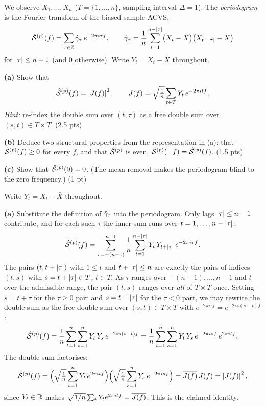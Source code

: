 \documentclass[11pt]{article}
\begin{document}

\statementstart
We observe $X_1,\dots,X_n$ ($T=\{1,\dots,n\}$, sampling interval $\Delta=1$). The \emph{periodogram} is the Fourier transform of the biased sample ACVS,
\[
\hat{\mathcal{S}}^{(p)}(f)=\sum_{\tau\in\mathbb{Z}}\hat{\gamma}_\tau\,e^{-2\pi i\tau f},
\qquad
\hat{\gamma}_\tau=\frac1n\sum_{t=1}^{n-\left\lvert \tau \right\rvert}\bigl(X_t-\bar X\bigr)\bigl(X_{t+\left\lvert \tau \right\rvert}-\bar X\bigr)
\]
for $\left\lvert \tau \right\rvert\le n-1$ (and $0$ otherwise). Write $Y_t=X_t-\bar X$ throughout.

\textbf{(a)} Show that
\[
\hat{\mathcal{S}}^{(p)}(f)=\left\lvert J(f) \right\rvert^2,\qquad J(f)=\sqrt{\tfrac1n}\sum_{t\in T} Y_t\,e^{-2\pi i t f}.
\]
\emph{Hint:} re-index the double sum over $(t,\tau)$ as a free double sum over $(s,t)\in T\times T$. \hfill(2.5 pts)

\textbf{(b)} Deduce two structural properties from the representation in (a): that $\hat{\mathcal{S}}^{(p)}(f)\ge0$ for every $f$, and that $\hat{\mathcal{S}}^{(p)}$ is even, $\hat{\mathcal{S}}^{(p)}(-f)=\hat{\mathcal{S}}^{(p)}(f)$. \hfill(1.5 pts)

\textbf{(c)} Show that $\hat{\mathcal{S}}^{(p)}(0)=0$. (The mean removal makes the periodogram blind to the zero frequency.) \hfill(1 pt)
\statementend

Write $Y_t=X_t-\bar X$ throughout.

\textbf{(a)} Substitute the definition of $\hat{\gamma}_\tau$ into the periodogram. Only lags $\left\lvert \tau \right\rvert\le n-1$ contribute, and for each such $\tau$ the inner sum runs over $t=1,\dots,n-\left\lvert \tau \right\rvert$:
\[
\hat{\mathcal{S}}^{(p)}(f)=\sum_{\tau=-(n-1)}^{n-1}\frac1n\sum_{t=1}^{n-\left\lvert \tau \right\rvert} Y_t\,Y_{t+\left\lvert \tau \right\rvert}\,e^{-2\pi i\tau f}.
\]
The pairs $(t,t+\left\lvert \tau \right\rvert)$ with $1\le t$ and $t+\left\lvert \tau \right\rvert\le n$ are exactly the pairs of indices $(t,s)$ with $s=t+\left\lvert \tau \right\rvert\in T$, $t\in T$. As $\tau$ ranges over $-(n-1),\dots,n-1$ and $t$ over the admissible range, the pair $(t,s)$ ranges over \emph{all} of $T\times T$ once. Setting $s=t+\tau$ for the $\tau\ge0$ part and $s=t-\left\lvert \tau \right\rvert$ for the $\tau<0$ part, we may rewrite the double sum as the free double sum over $(s,t)\in T\times T$ with $e^{-2\pi i\tau f}=e^{-2\pi i(s-t)f}$:
\[
\hat{\mathcal{S}}^{(p)}(f)
=\frac1n\sum_{t=1}^{n}\sum_{s=1}^{n} Y_t\,Y_s\,e^{-2\pi i(s-t)f}
=\frac1n\sum_{t=1}^{n}\sum_{s=1}^{n} Y_t\,Y_s\,e^{-2\pi i s f}\,e^{2\pi i t f}.
\]
The double sum factorises:
\[
\hat{\mathcal{S}}^{(p)}(f)
=\Bigl(\sqrt{\tfrac1n}\sum_{t=1}^{n} Y_t\,e^{2\pi i t f}\Bigr)
 \Bigl(\sqrt{\tfrac1n}\sum_{s=1}^{n} Y_s\,e^{-2\pi i s f}\Bigr)
=\overline{J(f)}\,J(f)=\left\lvert J(f) \right\rvert^2,
\]
since $Y_t\in\mathbb{R}$ makes $\sqrt{1/n}\sum_t Y_t e^{2\pi i tf}=\overline{J(f)}$. This is the claimed identity.
\end{document}
